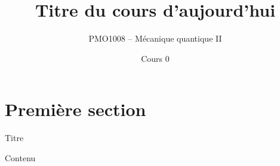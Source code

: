 \documentclass[xcolor=svgnames,t,aspectratio=169,handout]{uqtrcours}
\title[]{Titre du cours d'aujourd'hui}
\subtitle{PMO1008 -- Mécanique quantique II}
\date[]{Cours 0}
\begin{document}
\begin{frame}
  \titlepage
  \thispagestyle{empty}
\end{frame}

\frame{\tableofcontents}

\section{Première section}
\frame{\sectionpage}

\begin{frame}{Titre}

Contenu

\end{frame}
\end{document}
